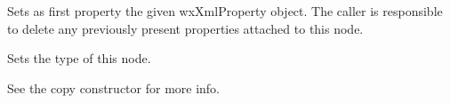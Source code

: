 
Sets as first property the given wxXmlProperty object.
The caller is responsible to delete any previously present properties attached to this node.

\label{wxxmlnodesettype}


Sets the type of this node.

\label{wxxmlnodeoperatorassign}


See the copy constructor for more info.

